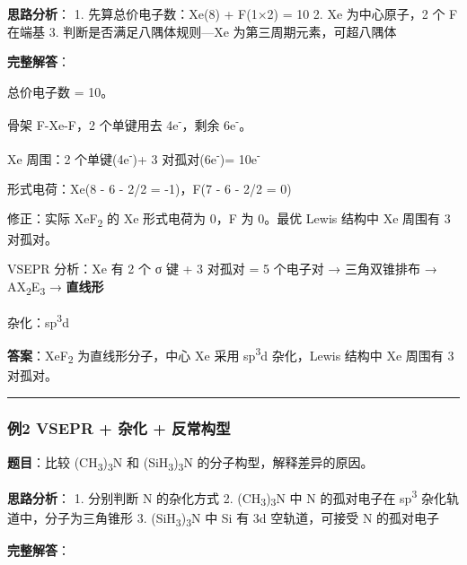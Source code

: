 \textbf{思路分析}：
1. 先算总价电子数：Xe(8) + F(1×2) = 10
2. Xe 为中心原子，2 个 F 在端基
3. 判断是否满足八隅体规则---Xe 为第三周期元素，可超八隅体

\textbf{完整解答}：

总价电子数 = 10。

骨架 F-Xe-F，2 个单键用去 4e\textsuperscript{-}，剩余 6e\textsuperscript{-}。

Xe 周围：2 个单键(4e\textsuperscript{-})+ 3 对孤对(6e\textsuperscript{-})= 10e\textsuperscript{-}

形式电荷：Xe(8 - 6 - 2/2 = -1)，F(7 - 6 - 2/2 = 0)

修正：实际 XeF\textsubscript{2} 的 Xe 形式电荷为 0，F 为 0。最优 Lewis 结构中 Xe 周围有 3 对孤对。

VSEPR 分析：Xe 有 2 个 σ 键 + 3 对孤对 = 5 个电子对 → 三角双锥排布 → AX\textsubscript{2}E\textsubscript{3} → \textbf{直线形}

杂化：sp\textsuperscript{3}d

\textbf{答案}：XeF\textsubscript{2} 为直线形分子，中心 Xe 采用 sp\textsuperscript{3}d 杂化，Lewis 结构中 Xe 周围有 3 对孤对。

\begin{center}\rule{0.5\linewidth}{0.5pt}\end{center}

\subsubsection{例2 VSEPR + 杂化 + 反常构型}\label{ux4f8b2-vsepr-ux6742ux5316-ux53cdux5e38ux6784ux578b}

\textbf{题目}：比较 (CH\textsubscript{3})\textsubscript{3}N 和 (SiH\textsubscript{3})\textsubscript{3}N 的分子构型，解释差异的原因。

\textbf{思路分析}：
1. 分别判断 N 的杂化方式
2. (CH\textsubscript{3})\textsubscript{3}N 中 N 的孤对电子在 sp\textsuperscript{3} 杂化轨道中，分子为三角锥形
3. (SiH\textsubscript{3})\textsubscript{3}N 中 Si 有 3d 空轨道，可接受 N 的孤对电子

\textbf{完整解答}：


